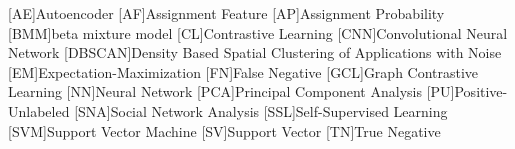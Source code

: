 \begin{acronym}

    [AE]{Autoencoder}
    [AF]{Assignment Feature}
    [AP]{Assignment Probability}
    [BMM]{beta mixture model}
    [CL]{Contrastive Learning}
    [CNN]{Convolutional Neural Network}
    [DBSCAN]{Density Based Spatial Clustering of Applications with Noise}
    [EM]{Expectation-Maximization}
    [FN]{False Negative}
    [GCL]{Graph Contrastive Learning}
    [NN]{Neural Network}
    [PCA]{Principal Component Analysis}
    [PU]{Positive-Unlabeled}
    [SNA]{Social Network Analysis}    
    [SSL]{Self-Supervised Learning}
    [SVM]{Support Vector Machine}
    [SV]{Support Vector}
    [TN]{True Negative}

\end{acronym}